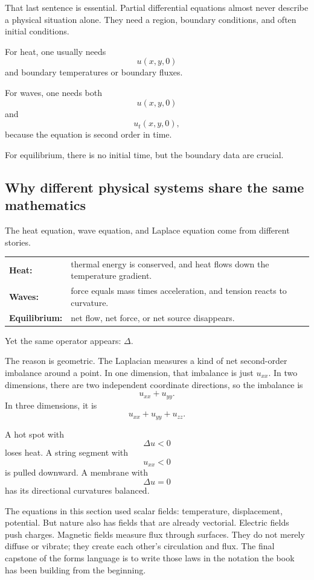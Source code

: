 That last sentence is essential.  Partial differential equations almost never describe a
physical situation alone.  They need a region, boundary conditions, and often initial
conditions.

For heat, one usually needs
\[
    u(x,y,0)
\]
and boundary temperatures or boundary fluxes.

For waves, one needs both
\[
    u(x,y,0)
\]
and
\[
    u_t(x,y,0),
\]
because the equation is second order in time.

For equilibrium, there is no initial time, but the boundary data are crucial.

\subsection{Why different physical systems share the same mathematics}

The heat equation, wave equation, and Laplace equation come from different stories.

\begin{center}
\renewcommand{\arraystretch}{1.5}
\begin{tabular}{@{}l p{10cm}@{}}
    \textbf{Heat:} & thermal energy is conserved, and heat flows down the temperature gradient. \\
    \textbf{Waves:} & force equals mass times acceleration, and tension reacts to curvature. \\
    \textbf{Equilibrium:} & net flow, net force, or net source disappears.
\end{tabular}
\end{center}

Yet the same operator appears:
\(
    \Delta.
\)

The reason is geometric.  The Laplacian measures a kind of net second-order imbalance
around a point.  In one dimension, that imbalance is just
\(
    u_{xx}.
\)
In two dimensions, there are two independent coordinate directions, so the imbalance is
\[
    u_{xx}+u_{yy}.
\]
In three dimensions, it is
\[
    u_{xx}+u_{yy}+u_{zz}.
\]

A hot spot with
\[
    \Delta u<0
\]
loses heat.  A string segment with
\[
    u_{xx}<0
\]
is pulled downward.  A membrane with
\[
    \Delta u=0
\]
has its directional curvatures balanced.


The equations in this section used scalar fields: temperature, displacement, potential.
But nature also has fields that are already vectorial.  Electric fields push charges.
Magnetic fields measure flux through surfaces.  They do not merely diffuse or vibrate;
they create each other's circulation and flux.  The final capstone of the forms language
is to write those laws in the notation the book has been building from the beginning.

